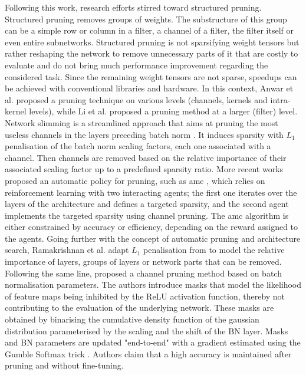 Following this work, research efforts stirred toward structured pruning.
Structured pruning removes groups of weights. The substructure of this group can
be a simple row or column in a filter, a channel of a filter, the filter itself
or even entire subnetworks. Structured pruning is not sparsifying weight tensors
but rather reshaping the network to remove unnecessary parts of it that are
costly to evaluate and do not bring much performance improvement regarding the
considered task. Since the remaining weight tensors are not sparse, speedups can
be achieved with conventional libraries and hardware. In this context, Anwar et
al. \cite{anwar2017structured} proposed a pruning technique on various levels
(channels, kernels and intra-kernel levels), while Li et al.
\cite{DBLP:conf/iclr/0022KDSG17} proposed a pruning method at a larger (filter)
level. Network slimming \cite{DBLP:conf/iccv/LiuLSHYZ17} is a streamlined
approach that aims at pruning the most useless channels in the layers preceding
\ac{batch norm} \cite{DBLP:conf/icml/IoffeS15}. It induces sparsity with
$L_1$ penalisation of the \ac{batch norm} scaling factors, each one
associated with a channel. Then channels are removed based on the relative
importance of their associated scaling factor up to a predefined sparsity ratio.
More recent works proposed an automatic policy for pruning, such as \ac{amc}
\cite{DBLP:conf/eccv/HeLLWLH18}, which relies on reinforcement learning with two
interacting agents; the first one iterates over the layers of the architecture
and defines a targeted sparsity, and the second agent implements the targeted
sparsity using channel pruning. The \ac{amc} algorithm is either constrained by
accuracy or efficiency, depending on the reward assigned to the agents. Going
further with the concept of automatic pruning and architecture search,
Ramakrishnan et al. \cite{DBLP:conf/crv/RamakrishnanSN20} adapt $L_1$
penalisation from \cite{DBLP:conf/iccv/LiuLSHYZ17} to model the relative
importance of layers, groups of layers or network parts that can be removed.
Following the same line, \cite{DBLP:conf/icml/KangH20} proposed a channel
pruning method based on batch normalisation parameters. The authors introduce
masks that model the likelihood of feature maps being inhibited by the \ac{ReLU}
activation function, thereby not contributing to the evaluation of the
underlying network. These masks are obtained by binarising the cumulative
density function of the gaussian distribution parameterised by the scaling and
the shift of the BN layer. Masks and BN parameters are updated "end-to-end" with
a gradient estimated using the Gumble Softmax trick
\cite{DBLP:conf/iclr/JangGP17}. Authors claim that a high accuracy is maintained
after pruning and without fine-tuning. \\



